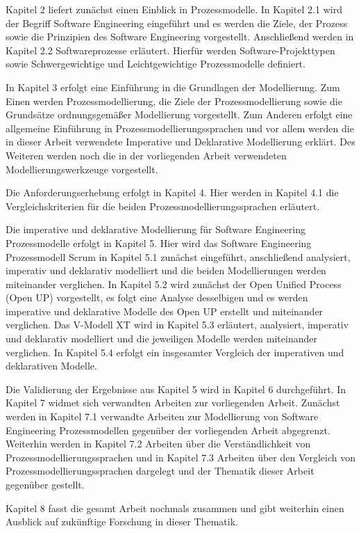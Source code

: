 Kapitel 2 liefert zunächst einen Einblick in Prozessmodelle. In Kapitel 2.1 wird der Begriff Software Engineering eingeführt und es werden die Ziele, der Prozess sowie die Prinzipien des Software Engineering vorgestellt. Anschließend werden in Kapitel 2.2 Softwareprozesse erläutert. Hierfür werden Software-Projekttypen sowie Schwergewichtige und Leichtgewichtige Prozessmodelle definiert.\newline

In Kapitel 3 erfolgt eine Einführung in die Grundlagen der Modellierung. Zum Einen werden Prozessmodellierung, die Ziele der Prozessmodellierung sowie die Grundsätze ordnungsgemäßer Modellierung vorgestellt. Zum Anderen erfolgt eine allgemeine Einführung in Prozessmodellierungssprachen und vor allem werden die in dieser Arbeit verwendete Imperative und Deklarative Modellierung erklärt. Des Weiteren werden noch die in der vorliegenden Arbeit verwendeten Modellierungswerkzeuge vorgestellt.\newline

Die Anforderungserhebung erfolgt in Kapitel 4. Hier werden in Kapitel 4.1 die Vergleichskriterien für die beiden Prozessmodellierungssprachen erläutert.\newline

Die imperative und deklarative Modellierung für Software Engineering Prozessmodelle erfolgt in Kapitel 5. Hier wird das Software Engineering Prozessmodell Scrum in Kapitel 5.1 zunächst eingeführt, anschließend analysiert, imperativ und deklarativ modelliert und die beiden Modellierungen werden miteinander verglichen. In Kapitel 5.2 wird zunächst der Open Unified Process (Open UP) vorgestellt, es folgt eine Analyse desselbigen und es werden imperative und deklarative Modelle des Open UP erstellt und miteinander verglichen. Das V-Modell XT wird in Kapitel 5.3 erläutert, analysiert, imperativ und deklarativ modelliert und die jeweiligen Modelle werden miteinander verglichen. In Kapitel 5.4 erfolgt ein insgesamter Vergleich der imperativen und deklarativen Modelle.\newline

Die Validierung der Ergebnisse aus Kapitel 5 wird in Kapitel 6 durchgeführt.
In Kapitel 7 widmet sich verwandten Arbeiten zur vorliegenden Arbeit. Zunächst werden in Kapitel 7.1 verwandte Arbeiten zur Modellierung von Software Engineering Prozessmodellen gegenüber der vorliegenden Arbeit abgegrenzt. Weiterhin werden in Kapitel 7.2 Arbeiten über die Verständlichkeit von Prozessmodellierungssprachen und in Kapitel 7.3 Arbeiten über den Vergleich von Prozessmodellierungssprachen dargelegt und der Thematik dieser Arbeit gegenüber gestellt.\newline

Kapitel 8 fasst die gesamt Arbeit nochmals zusammen und gibt weiterhin einen Ausblick auf zukünftige Forschung in dieser Thematik.



